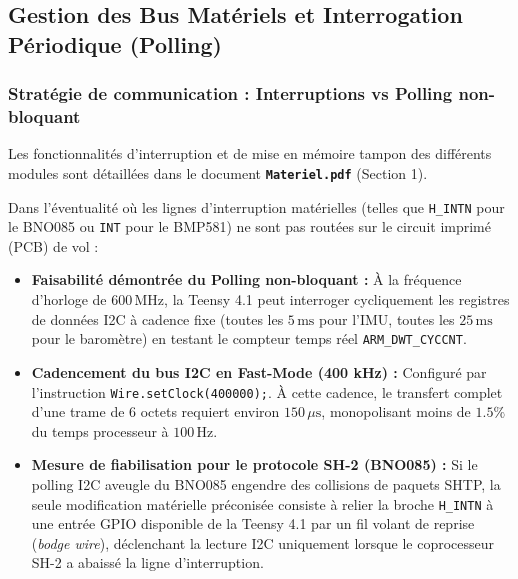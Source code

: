 \documentclass[../Implementation.tex]{subfiles}
\begin{document}
\subsection{Gestion des Bus Matériels et Interrogation Périodique (Polling)}

\subsubsection{Stratégie de communication : Interruptions vs Polling non-bloquant}
Les fonctionnalités d'interruption et de mise en mémoire tampon des différents modules sont détaillées dans le document \textbf{\texttt{Materiel.pdf}} (Section 1). 

Dans l'éventualité où les lignes d'interruption matérielles (telles que \lstinline|H_INTN| pour le BNO085 ou \lstinline|INT| pour le BMP581) ne sont pas routées sur le circuit imprimé (PCB) de vol :
\begin{itemize}
    \item \textbf{Faisabilité démontrée du Polling non-bloquant :}
    À la fréquence d'horloge de $600\,\text{MHz}$, la Teensy 4.1 peut interroger cycliquement les registres de données I2C à cadence fixe (toutes les $5\,\text{ms}$ pour l'IMU, toutes les $25\,\text{ms}$ pour le baromètre) en testant le compteur temps réel \lstinline|ARM_DWT_CYCCNT|.
    \item \textbf{Cadencement du bus I2C en Fast-Mode (400 kHz) :}
    Configuré par l'instruction \lstinline|Wire.setClock(400000);|. À cette cadence, le transfert complet d'une trame de 6 octets requiert environ $150\,\mu\text{s}$, monopolisant moins de $1.5\%$ du temps processeur à $100\,\text{Hz}$.
    \item \textbf{Mesure de fiabilisation pour le protocole SH-2 (BNO085) :}
    Si le polling I2C aveugle du BNO085 engendre des collisions de paquets SHTP, la seule modification matérielle préconisée consiste à relier la broche \lstinline|H_INTN| à une entrée GPIO disponible de la Teensy 4.1 par un fil volant de reprise (\textit{bodge wire}), déclenchant la lecture I2C uniquement lorsque le coprocesseur SH-2 a abaissé la ligne d'interruption.
\end{itemize}
\end{document}
